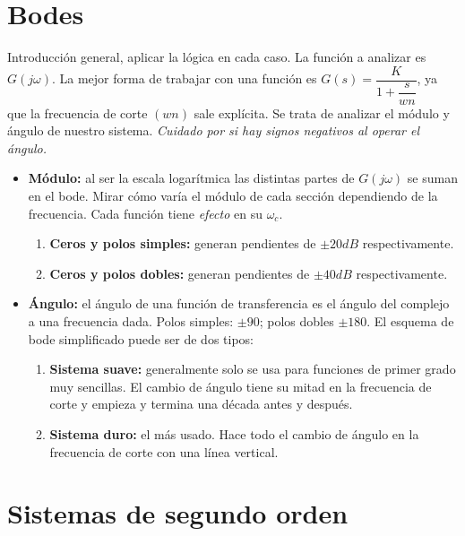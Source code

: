 \documentclass[a4paper, twocolumn, 10pt]{article}
\newlength{\du}
\begin{document}
\section{Bodes}

Introducción general, aplicar la lógica en cada caso. La función a analizar es $G(j\omega)$. La mejor forma de trabajar con una función es $G(s) = \dfrac{K}{1 + \dfrac{s}{wn}}$, ya que la frecuencia de corte $(wn)$ sale explícita. Se trata de analizar el módulo y ángulo de nuestro sistema. \textit{Cuidado por si hay signos negativos al operar el ángulo.}

\begin{itemize}
	\item \textbf{Módulo:} al ser la escala logarítmica las distintas partes de $G(j\omega)$ se suman en el bode. Mirar cómo varía el módulo de cada sección dependiendo de la frecuencia. Cada función tiene \textit{efecto} en su $\omega_c$.
	\begin{enumerate}
		\item \textbf{Ceros y polos simples:} generan pendientes de $\pm20dB$ respectivamente.
		\item \textbf{Ceros y polos dobles:} generan pendientes de $\pm40dB$ respectivamente.
	\end{enumerate}
	\item \textbf{Ángulo:} el ángulo de una función de transferencia es el ángulo del complejo a una frecuencia dada. Polos simples: $\pm90$\textdegree; polos dobles $\pm180$\textdegree. El esquema de bode simplificado puede ser de dos tipos:
	\begin{enumerate}
		\item \textbf{Sistema suave:} generalmente solo se usa para funciones de primer grado muy sencillas. El cambio de ángulo tiene su mitad en la frecuencia de corte y empieza y termina una década antes y después.
		\item \textbf{Sistema duro:} el más usado. Hace todo el cambio de ángulo en la frecuencia de corte con una línea vertical.
	\end{enumerate}
\end{itemize}

\section{Sistemas de segundo orden}
\end{document}

